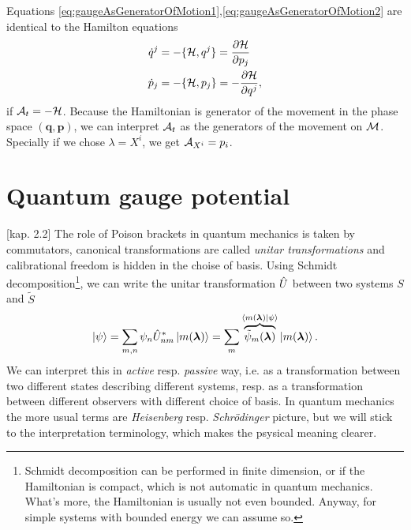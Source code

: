 Equations \ref{eq:gaugeAsGeneratorOfMotion1},\ref{eq:gaugeAsGeneratorOfMotion2} are identical to the Hamilton equations
\begin{equation}
\begin{split}
    \dot{q}^j&=-\{\mathcal{H},q^j\} = \frac{\partial \mathcal{H}}{\partial p_j}\\
    \dot{p}_j&=-\{\mathcal{H},p_j\} = -\frac{\partial \mathcal{H}}{\partial q^j},
\end{split}
\end{equation}
if $\mathcal{A}_t=-\mathcal{H}$. Because the Hamiltonian is generator of the movement in the phase space $(\bm{q},\bm{p})$, we can interpret $\mathcal{A}_t$ as the generators of the movement on $\mathcal{M}$. Specially if we chose $\lambda=X^i$, we get $\mathcal{A}_{X^i}=p_i$.




\section{Quantum gauge potential}
\citep{kolodrubez}[kap. 2.2]
The role of Poison brackets in quantum mechanics is taken by commutators, canonical transformations are called \emph{unitar transformations} and calibrational freedom is hidden in the choise of basis. Using Schmidt decomposition\footnote{Schmidt decomposition can be performed in finite dimension, or if the Hamiltonian is compact, which is not automatic in quantum mechanics. What's more, the Hamiltonian is usually not even bounded. Anyway, for simple systems with bounded energy we can assume so.}, we can write the unitar transformation $\hat{U}$ between two systems $S$ and $\tilde{S}$
\begin{equation}
    \ket{\psi} = \sum_{m,n}\psi_n \hat{U}_{nm}^*\ket{m({\bm\lambda})} = \sum_m \overbrace{\tilde{\psi}_m({\bm\lambda})}^{\braket{m({\bm\lambda})|\psi}}\ket{m({\bm\lambda})}.
\end{equation}
We can interpret this in \emph{active} resp. \emph{passive} way, i.e. as a transformation between two different states describing different systems, resp. as a transformation between different observers with different choice of basis. In quantum mechanics the more usual terms are \emph{Heisenberg} resp. \emph{Schrödinger} picture, but we will stick to the interpretation terminology, which makes the psysical meaning clearer.

